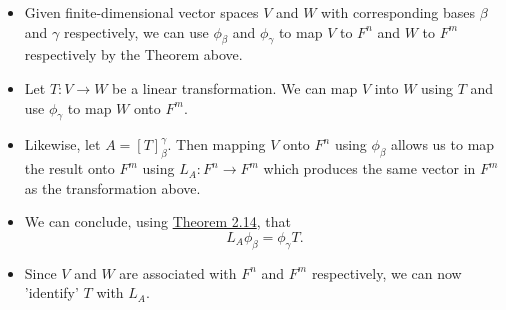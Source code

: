 \begin{itemize}
    \item Given finite-dimensional vector spaces \( V  \) and \( W  \) with corresponding bases \( \beta \) and \( \gamma \) respectively, we can use \( {\phi}_{\beta} \) and \( {\phi}_{\gamma} \) to map \( V  \) to \( F^{n}  \) and \( W \) to \( F^{m} \) respectively by the Theorem above.
    \item Let \( T: V \to W  \) be a linear transformation. We can map \( V  \) into \( W  \) using \( T  \) and use \( {\phi}_{\gamma} \) to map \( W  \) onto \( F^{m} \).
    \item Likewise, let \( A = [T]_{\beta}^{\gamma}  \). Then mapping \( V  \) onto \( F^{n} \) using \( {\phi}_{\beta} \) allows us to map the result onto \( F^{m} \) using \( {L}_{A}: F^{n} \to F^{m} \) which produces the same vector in \( F^{m} \) as the transformation above.
    \item We can conclude, using {\hyperref[Theorem 2.14]{Theorem 2.14}}, that 
        \[  {L}_{A} {\phi}_{\beta} = {\phi}_{\gamma}T. \]
    \item Since \( V \) and \( W  \) are associated with \( F^{n} \) and \( F^{m} \) respectively, we can now 'identify' \( T \) with \( {L}_{A} \).

\end{itemize}

